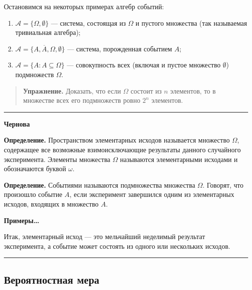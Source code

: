 \documentclass[11pt,a4paper]{article}
\renewcommand{\linethickness}{0.1ex}
\providecommand{\tightlist}{%
      \setlength{\itemsep}{0pt}\setlength{\parskip}{0pt}}
\begin{document}
Остановимся на некоторых примерах алгебр событий:

\begin{enumerate}
\def\labelenumi{\arabic{enumi}.}
\tightlist
\item
  \(\mathcal{A} = \{ \Omega, \emptyset \}\) --- система, состоящая из
  \(\Omega\) и пустого множества (так называемая тривиальная алгебра);
\item
  \(\mathcal{A} = \{ A, \overline{A}, \Omega, \emptyset \}\) ---
  система, порожденная событием \(A\);
\item
  \(\mathcal{A} = \{ A: A \subseteq \Omega \}\) --- совокупность всех
  (включая и пустое множество \(\emptyset\)) подмножеств \(\Omega\).
\end{enumerate}

\begin{quote}
\textbf{Упражнение.} Доказать, что если \(\Omega\) состоит из \(n\)
элементов, то в множестве всех его подмножеств ровно \(2^n\) элементов.
\end{quote}

    \begin{center}\rule{0.5\linewidth}{\linethickness}\end{center}

\textbf{Чернова}

\textbf{Определение.} Пространством элементарных исходов называется
множество \(\Omega\), содержащее все возможные взимоисключающие
результаты данного случайного эксперимента. Элементы множества
\(\Omega\) называются элементарными исходами и обозначаются буквой
\(\omega\).

\textbf{Определение.} Событиями называются подмножества множества
\(\Omega\). Говорят, что произошло событие \(A\), если эксперимент
завершился одним из элементарных исходов, входящих в множество \(A\).

\textbf{Примеры\ldots{}}

Итак, элементарный исход --- это мельчайший неделимый результат
эксперимента, а событие может состоять из одного или нескольких исходов.

\begin{center}\rule{0.5\linewidth}{\linethickness}\end{center}

    \hypertarget{ux432ux435ux440ux43eux44fux442ux43dux43eux441ux442ux43dux430ux44f-ux43cux435ux440ux430}{%
\subsection{Вероятностная
мера}\label{ux432ux435ux440ux43eux44fux442ux43dux43eux441ux442ux43dux430ux44f-ux43cux435ux440ux430}}
\end{document}
